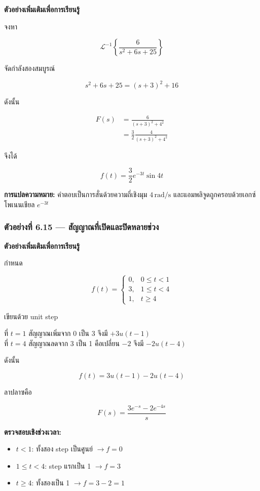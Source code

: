 \textbf{ตัวอย่างเพิ่มเติมเพื่อการเรียนรู้}

จงหา

\[
\mathcal{L}^{-1}\left\{\frac{6}{s^2+6s+25}\right\}
\]

จัดกำลังสองสมบูรณ์

\[
s^2+6s+25=(s+3)^2+16
\]

ดังนั้น

\[
\begin{aligned}
    F(s)&=\frac{6}{(s+3)^2+4^2}\\
    &=\frac{3}{2}\frac{4}{(s+3)^2+4^2}
\end{aligned}
\]

จึงได้

\[
\boxed{f(t)=\frac{3}{2}e^{-3t}\sin 4t}
\]

\textbf{การแปลความหมาย:} คำตอบเป็นการสั่นด้วยความถี่เชิงมุม $4\,\mathrm{rad/s}$ และแอมพลิจูดถูกครอบด้วยเอกซ์โพเนนเชียล $e^{-3t}$

\subsubsection{ตัวอย่างที่ 6.15 — สัญญาณที่เปิดและปิดหลายช่วง}

\textbf{ตัวอย่างเพิ่มเติมเพื่อการเรียนรู้}

กำหนด

\[
f(t)=
\begin{cases}
0,&0\le t<1\\
3,&1\le t<4\\
1,&t\ge 4
\end{cases}
\]

เขียนด้วย unit step

ที่ $t=1$ สัญญาณเพิ่มจาก 0 เป็น 3 จึงมี $+3u(t-1)$\\
ที่ $t=4$ สัญญาณลดจาก 3 เป็น 1 คือเปลี่ยน $-2$ จึงมี $-2u(t-4)$

ดังนั้น

\[
\boxed{f(t)=3u(t-1)-2u(t-4)}
\]

ลาปลาซคือ

\[
\boxed{F(s)=\frac{3e^{-s}-2e^{-4s}}{s}}
\]

\textbf{ตรวจสอบเชิงช่วงเวลา:}

\begin{itemize}
    \item $t<1$: ทั้งสอง step เป็นศูนย์ $\to f=0$
    \item $1\le t<4$: step แรกเป็น 1 $\to f=3$
    \item $t\ge4$: ทั้งสองเป็น 1 $\to f=3-2=1$
\end{itemize}

